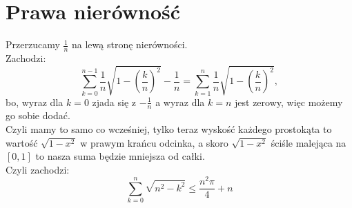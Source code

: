 \documentclass{article}
\begin{document}
\section*{Prawa nierówność}
Przerzucamy $\frac{1}{n}$ na lewą stronę nierówności. \\
Zachodzi:
$$\sum_{k=0}^{n-1}\frac{1}{n}\sqrt{1-\left(\frac{k}{n}\right)^2}-\frac{1}{n} = \sum_{k=1}^{n}\frac{1}{n}\sqrt{1-\left(\frac{k}{n}\right)^2},$$
bo, wyraz dla $k=0$ zjada się z $-\frac{1}{n}$ a wyraz dla $k=n$ jest zerowy, więc możemy go sobie dodać. \\
Czyli mamy to samo co wcześniej, tylko teraz wyskość każdego prostokąta to wartość $\sqrt{1-x^2}$ w prawym krańcu odcinka, a skoro $\sqrt{1-x^2}$ ściśle malejąca na $[0, 1]$ to nasza suma będzie mniejsza od całki.\\
Czyli zachodzi:
$$ \sum_{k=0}^{n}\sqrt{n^2-k^2} \le \frac{n^2 \pi}{4} + n$$
\end{document}
